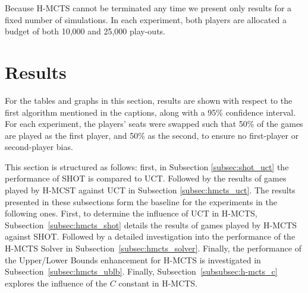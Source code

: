 \documentclass{kecsmstr}
\begin{document}
\begin{table}[ht]
\centering
\captionsetup{justification=centering,margin=1cm}
\tabcolsep=0.45cm
\vspace{3mm}
{\caption{$C$ Constants used by H-MCTS and UCT.} \label{tab:uct_c}}
\end{table}

Because H-MCTS cannot be terminated any time we present only results for a fixed number of simulations. In each experiment, both players are allocated a budget of both 10,000 and 25,000 play-outs.
\newpage
\section{Results}
\label{sec:results}
For the tables and graphs in this section, results are shown with respect to the first algorithm mentioned in the captions, along with a 95\% confidence interval. For each experiment, the players' seats were swapped such that 50\% of the games are played as the first player, and 50\% as the second, to ensure no first-player or second-player bias.

This section is structured as follows: first, in Subsection \ref{subsec:shot_uct} the performance of SHOT is compared to UCT. Followed by the results of games played by H-MCST against UCT in Subsection \ref{subsec:hmcts_uct}. The results presented in these subsections form the baseline for the experiments in the following ones. First, to determine the influence of UCT in H-MCTS, Subsection~\ref{subsec:hmcts_shot} details the results of games played by H-MCTS against SHOT. Followed by a detailed investigation into the performance of the H-MCTS Solver in Subsection~\ref{subsec:hmcts_solver}. Finally, the performance of the Upper/Lower Bounds enhancement for H-MCTS is investigated in Subsection~\ref{subsec:hmcts_ublb}. Finally, Subsection~\ref{subsubsec:h-mcts_c} explores the influence of the $C$ constant in H-MCTS.
\end{document}
